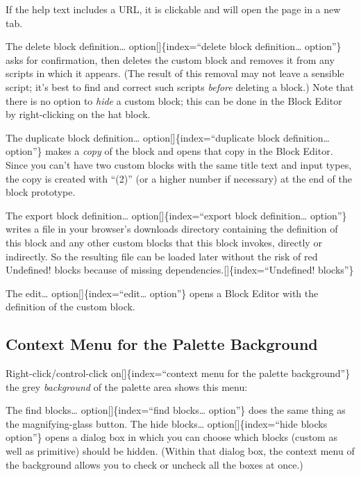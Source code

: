 \documentclass[
  letterpaper,
]{book}
\begin{document}
If the help text includes a URL, it is clickable and will open the page
in a new tab.

The delete block definition\ldots{} option{[}{]}\{index=``delete block
definition\ldots{} option''\} asks for confirmation, then deletes the
custom block and removes it from any scripts in which it appears. (The
result of this removal may not leave a sensible script; it's best to
find and correct such scripts \emph{before} deleting a block.) Note that
there is no option to \emph{hide} a custom block; this can be done in
the Block Editor by right-clicking on the hat block.

The duplicate block definition\ldots{} option{[}{]}\{index=``duplicate
block definition\ldots{} option''\} makes a \emph{copy} of the block and
opens that copy in the Block Editor. Since you can't have two custom
blocks with the same title text and input types, the copy is created
with ``(2)'' (or a higher number if necessary) at the end of the block
prototype.

The export block definition\ldots{} option{[}{]}\{index=``export block
definition\ldots{} option''\} writes a file in your browser's downloads
directory containing the definition of this block and any other custom
blocks that this block invokes, directly or indirectly. So the resulting
file can be loaded later without the risk of red Undefined! blocks
because of missing dependencies.{[}{]}\{index=``Undefined! blocks''\}

The edit\ldots{} option{[}{]}\{index=``edit\ldots{} option''\} opens a
Block Editor with the definition of the custom block.

\subsection{Context Menu for the Palette
Background}\label{context-menu-for-the-palette-background}

Right-click/control-click on{[}{]}\{index=``context menu for the palette
background''\} the grey \emph{background} of the palette area shows this
menu:

The find blocks\ldots{} option{[}{]}\{index=``find blocks\ldots{}
option''\} does the same thing as the magnifying-glass button. The hide
blocks\ldots{} option{[}{]}\{index=``hide blocks option''\} opens a
dialog box in which you can choose which blocks (custom as well as
primitive) should be hidden. (Within that dialog box, the context menu
of the background allows you to check or uncheck all the boxes at once.)
\end{document}

